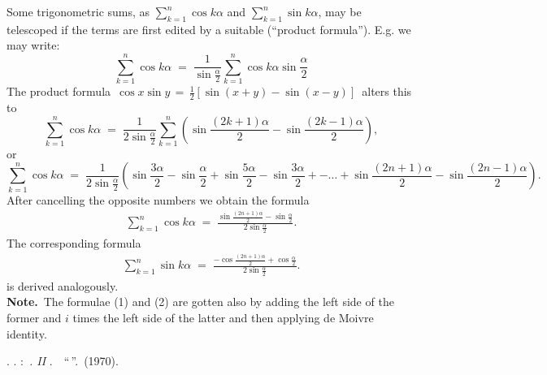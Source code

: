 \documentclass[12pt]{article}
\theoremstyle{definition}
\begin{document}
Some trigonometric sums, as $\sum_{k=1}^n\cos{k\alpha}$ and $\sum_{k=1}^n\sin{k\alpha}$, may be telescoped if the terms are first edited by a suitable  (``product formula'').  E.g. we may write:
$$\sum_{k=1}^n\cos{k\alpha} \;=\; 
\frac{1}{\sin\frac{\alpha}{2}}\sum_{k=1}^n\cos{k\alpha}\sin\frac{\alpha}{2}$$
The product formula \,$\cos{x}\sin{y} \,=\, \frac{1}{2}[\sin(x\!+\!y)-\sin(x\!-\!y)]$\, alters this to
$$\sum_{k=1}^n\cos{k\alpha} \;=\;
\frac{1}{2\sin\frac{\alpha}{2}}\sum_{k=1}^n\left(\sin\frac{(2k\!+\!1)\alpha}{2}-\sin\frac{(2k\!-\!1)\alpha}{2}\right),$$
or
$$\sum_{k=1}^n\cos{k\alpha} \;=\; \frac{1}{2\sin\frac{\alpha}{2}}\left(\sin\frac{3\alpha}{2}-\sin\frac{\alpha}{2}+\sin\frac{5\alpha}{2}
-\sin\frac{3\alpha}{2}+-\ldots+\sin\frac{(2n\!+\!1)\alpha}{2}-\sin\frac{(2n\!-\!1)\alpha}{2}\right).$$
After cancelling the opposite numbers we obtain the formula
\begin{align}
\sum_{k=1}^n\cos{k\alpha} \;=\; \frac{\sin\frac{(2n+1)\alpha}{2}-\sin\frac{\alpha}{2}}{2\sin\frac{\alpha}{2}}.
\end{align}
The corresponding formula
\begin{align}
\sum_{k=1}^n\sin{k\alpha} \;=\; \frac{-\cos\frac{(2n+1)\alpha}{2}+\cos\frac{\alpha}{2}}{2\sin\frac{\alpha}{2}}.
\end{align}
is derived analogously.\\

\textbf{Note.}\, The formulae (1) and (2) are gotten also by adding the left side of the former and $i$ times the left side of the latter and then applying de Moivre identity.

\begin{thebibliography}{7}
 \CYRL. \CYRD. \CYRK\cyru\cyrd\cyrr\cyrya\cyrv\cyrc\cyre\cyrv: 
{\em \CYRM\cyra\cyrt\cyre\cyrm\cyra\cyrt\cyri\cyrch\cyre\cyrs\cyrk\cyri\cyrishrt \,\cyra\cyrn\cyra\cyrl\cyri\cyrz. II \cyrt\cyro\cyrm}. \,\CYRI\cyrz\cyrd\cyra\cyrt\cyre\cyrl\cyrsftsn\cyrs\cyrt\cyrv\cyro \,
``\CYRV\cyrery\cyrs\cyrsh\cyra\cyrya \,\cyrsh\cyrk\cyro\cyrl\cyra''. \CYRM\cyro\cyrs\cyrk\cyrv\cyra \,(1970).
\end{thebibliography}
\end{document}
